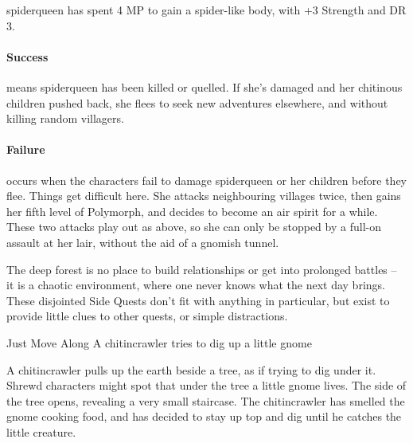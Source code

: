 \begin{multicols}{2}


\spiderqueen

\Gls{spiderqueen} has spent 4 MP to gain a spider-like body, with +3 Strength and DR 3.


\paragraph{Success} means \gls{spiderqueen} has been killed or quelled.
If she's damaged and her chitinous children pushed back, she flees to seek new adventures elsewhere, and without killing random villagers.

\paragraph{Failure} occurs when the characters fail to damage \gls{spiderqueen} or her children before they flee.
Things get difficult here.
She attacks neighbouring villages twice, then gains her fifth level of Polymorph, and decides to become an air spirit for a while.
These two attacks play out as above, so she can only be stopped by a full-on assault at her lair, without the aid of a gnomish tunnel.

\stopcontents[sq]

\label{interruptions}

\startcontents[sq]

\sqminitoc

\noindent
The deep forest is no place to build relationships or get into prolonged battles -- it is a chaotic environment, where one never knows what the next day brings.
These disjointed Side Quests don't fit with anything in particular, but exist to provide little clues to other quests, or simple distractions.

{Just Move Along}%
{A chitincrawler tries to dig up a little gnome}%

A chitincrawler pulls up the earth beside a tree, as if trying to dig under it.
Shrewd characters might spot that under the tree a little gnome lives.
The side of the tree opens, revealing a very small staircase.
The chitincrawler has smelled the gnome cooking food, and has decided to stay up top and dig until he catches the little creature.


\end{multicols}
